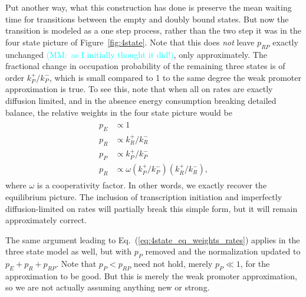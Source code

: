 \documentclass[12pt]{article}%
\newcommand{\rate}[3]{{#1}_{#2}^{#3}}
\newcommand{\mmnote}[1]{\textcolor{cyan}{(MM:~#1)}}
\newcommand{\fref}[1]{Figure~\ref{#1}}
\newcommand{\eref}[1]{Eq.~(\ref{#1})}
\begin{document}
Put another way, what this construction has done is preserve
the mean waiting time for transitions between the empty and doubly bound states.
But now the transition is modeled as a one step process,
rather than the two step it was in the four state picture of \fref{fig:4state}.
Note that this does \textit{not} leave $p_{RP}$ exactly unchanged
\mmnote{as I initially thought it did!},
only approximately.
The fractional change in occupation probability of the remaining three states
is of order $\rate{k}{P}{+}/\rate{k}{P}{-}$,
which is small compared to 1 to the same degree the weak promoter approximation is true.
To see this, note that when all on rates are exactly diffusion limited,
and in the absence energy consumption breaking detailed balance,
the relative weights in the four state picture would be
\begin{align}
\begin{split}
    p_E &\propto 1\\
    p_R &\propto \rate{k}{R}{+}/\rate{k}{R}{-}\\
    p_P &\propto \rate{k}{P}{+}/\rate{k}{P}{-}\\
    p_R &\propto \omega \left(\rate{k}{P}{+}/\rate{k}{P}{-}\right)
                        \left(\rate{k}{R}{+}/\rate{k}{R}{-}\right),
\end{split}
\label{eq:4state_eq_weights_rates}
\end{align}
where $\omega$ is a cooperativity factor.
In other words, we exactly recover the equilibrium picture.
The inclusion of transcription initiation and
imperfectly diffusion-limited on rates will partially break this simple form,
but it will remain approximately correct.

The same argument leading to \eref{eq:4state_eq_weights_rates}
applies in the three state model as well, but with $p_P$ removed
and the normalization updated to $p_E + p_R + p_{RP}$.
Note that $p_P < p_{RP}$ need not hold,
merely $p_P \ll 1$, for the approximation to be good.
But this is merely the weak promoter approximation,
so we are not actually assuming anything new or strong.
\end{document}
